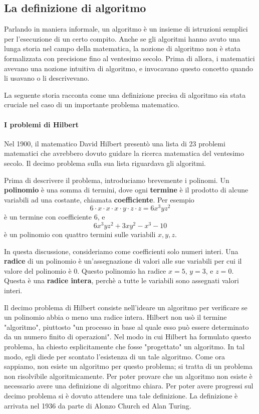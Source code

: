 \documentclass{article}
\begin{document}
\subsection{La definizione di algoritmo}

Parlando in maniera informale, un algoritmo è un insieme di istruzioni semplici per l'esecuzione di un certo compito.
Anche se gli algoritmi hanno avuto una lunga storia nel campo della matematica, la nozione di algoritmo non è stata formalizzata con precisione fino al ventesimo secolo.
Prima di allora, i matematici avevano una nozione intuitiva di algoritmo, e invocavano questo concetto quando li usavano o li descrivevano.

La seguente storia racconta come una definizione precisa di algoritmo sia stata cruciale nel caso di un importante problema matematico.

\paragraph{I problemi di Hilbert}
\label{def:hilbert_problems}
\text{ }

Nel 1900, il matematico David Hilbert presentò una lista di 23 problemi matematici che avrebbero dovuto guidare la ricerca matematica del ventesimo secolo.
Il decimo problema sulla sua lista riguardava gli algoritmi.

Prima di descrivere il problema, introduciamo brevemente i polinomi.
Un \textbf{polinomio} è una somma di termini, dove ogni \textbf{termine} è il prodotto di alcune variabili ad una costante, chiamata \textbf{coefficiente}.
Per esempio
$$
6 \cdot x \cdot x \cdot x \cdot y \cdot z \cdot z = 6x^3yz^2
$$
è un termine con coefficiente 6, e 
$$
6x^3yz^2 + 3xy^2 - x^3 - 10
$$
è un polinomio con quattro termini sulle variabili $x,y,z$.

In questa discussione, consideriamo come coefficienti solo numeri interi.
Una \textbf{radice} di un polinomio è un'assegnazione di valori alle sue variabili per cui il valore del polinomio è 0.
Questo polinomio ha radice $x = 5$, $y = 3$, e $z = 0$.
Questa è una \textbf{radice intera}, perchè a tutte le variabili sono assegnati valori interi.
\newline

Il decimo problema di Hilbert consiste nell'ideare un algoritmo per verificare se un polinomio abbia o meno una radice intera.
Hilbert non usò il termine "algoritmo", piuttosto "un processo in base al quale esso può essere determinato da un numero finito di operazioni".
Nel modo in cui Hilbert ha formulato questo problema, ha chiesto esplicitamente che fosse "progettato" un algoritmo. 
In tal modo, egli diede per scontato l'esistenza di un tale algoritmo.
Come ora sappiamo, non esiste un algoritmo per questo problema; si tratta di un problema non risolvibile algoritmicamente.
Per poter provare che un algoritmo non esiste è necessario avere una definizione di algoritmo chiara.
Per poter avere progressi sul decimo problema si è dovuto attendere una tale definizione.
La definizione è arrivata nel 1936 da parte di Alonzo Church ed Alan Turing.
\end{document}
